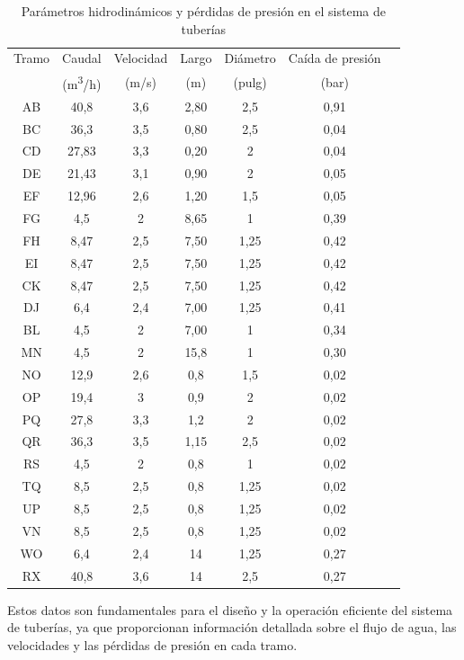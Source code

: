 \documentclass[11pt,a4paper]{article}  %
\begin{document}
\begin{table}[h!]
\centering
\caption{Parámetros hidrodinámicos y pérdidas de presión en el sistema de tuberías}
\label{tabla_latex_seleccionada}
\begin{tabular}{ccccccc}
\toprule
Tramo & Caudal & Velocidad & Largo & Diámetro & Caída de presión \\
 & (m\textsuperscript{3}/h) & (m/s) & (m) & (pulg) & (bar) \\
\midrule
AB & 40,8 & 3,6 & 2,80 & 2,5 & 0,91 \\
BC & 36,3 & 3,5 & 0,80 & 2,5 & 0,04 \\
CD & 27,83 & 3,3 & 0,20 & 2 & 0,04 \\
DE & 21,43 & 3,1 & 0,90 & 2 & 0,05 \\
EF & 12,96 & 2,6 & 1,20 & 1,5 & 0,05 \\
FG & 4,5 & 2 & 8,65 & 1 & 0,39 \\
FH & 8,47 & 2,5 & 7,50 & 1,25 & 0,42 \\
EI & 8,47 & 2,5 & 7,50 & 1,25 & 0,42 \\
CK & 8,47 & 2,5 & 7,50 & 1,25 & 0,42 \\
DJ & 6,4 & 2,4 & 7,00 & 1,25 & 0,41 \\
BL & 4,5 & 2 & 7,00 & 1 & 0,34 \\
\midrule
MN & 4,5 & 2 & 15,8 & 1 & 0,30 \\
NO & 12,9 & 2,6 & 0,8 & 1,5 & 0,02 \\
OP & 19,4 & 3 & 0,9 & 2 & 0,02 \\
PQ & 27,8 & 3,3 & 1,2 & 2 & 0,02 \\
QR & 36,3 & 3,5 & 1,15 & 2,5 & 0,02 \\
RS & 4,5 & 2 & 0,8 & 1 & 0,02 \\
TQ & 8,5 & 2,5 & 0,8 & 1,25 & 0,02 \\
UP & 8,5 & 2,5 & 0,8 & 1,25 & 0,02 \\
VN & 8,5 & 2,5 & 0,8 & 1,25 & 0,02 \\
WO & 6,4 & 2,4 & 14 & 1,25 & 0,27 \\
RX & 40,8 & 3,6 & 14 & 2,5 & 0,27 \\
\bottomrule
\end{tabular}
\end{table}

Estos datos son fundamentales para el diseño y la operación eficiente del sistema de tuberías, ya que proporcionan información detallada sobre el flujo de agua, las velocidades y las pérdidas de presión en cada tramo.
\end{document}
